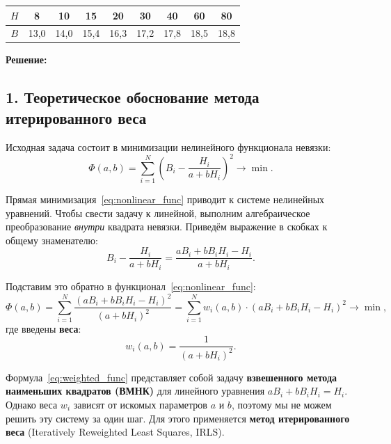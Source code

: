 \documentclass{article}
\begin{document}
\begin{center}
\begin{tabular}{|c|c|c|c|c|c|c|c|c|}
\hline
$H$ & 8 & 10 & 15 & 20 & 30 & 40 & 60 & 80 \\
\hline
$B$ & 13,0 & 14,0 & 15,4 & 16,3 & 17,2 & 17,8 & 18,5 & 18,8 \\
\hline
\end{tabular}
\end{center}

\vspace{0.5cm}
\textbf{Решение:}

\subsection*{1. Теоретическое обоснование метода итерированного веса}

Исходная задача состоит в минимизации нелинейного функционала невязки:
\begin{equation}
\Phi(a, b) = \sum_{i=1}^{N} \left(B_i - \frac{H_i}{a + bH_i}\right)^2 \to \min.
\label{eq:nonlinear_func}
\end{equation}

Прямая минимизация~\eqref{eq:nonlinear_func} приводит к системе нелинейных уравнений. Чтобы свести задачу к линейной, выполним алгебраическое преобразование \textit{внутри} квадрата невязки. Приведём выражение в скобках к общему знаменателю:
\begin{equation}
B_i - \frac{H_i}{a + bH_i} = \frac{aB_i + bB_iH_i - H_i}{a + bH_i}.
\end{equation}

Подставим это обратно в функционал~\eqref{eq:nonlinear_func}:
\begin{equation}
\Phi(a, b) = \sum_{i=1}^{N} \frac{(aB_i + bB_iH_i - H_i)^2}{(a + bH_i)^2} = \sum_{i=1}^{N} w_i(a, b) \cdot (aB_i + bB_iH_i - H_i)^2 \to \min,
\label{eq:weighted_func}
\end{equation}
где введены \textbf{веса}:
\begin{equation}
w_i(a, b) = \frac{1}{(a + bH_i)^2}.
\end{equation}

Формула~\eqref{eq:weighted_func} представляет собой задачу \textbf{взвешенного метода наименьших квадратов (ВМНК)} для линейного уравнения $aB_i + bB_iH_i = H_i$. Однако веса $w_i$ зависят от искомых параметров $a$ и $b$, поэтому мы не можем решить эту систему за один шаг. Для этого применяется \textbf{метод итерированного веса} (Iteratively Reweighted Least Squares, IRLS).
\end{document}
